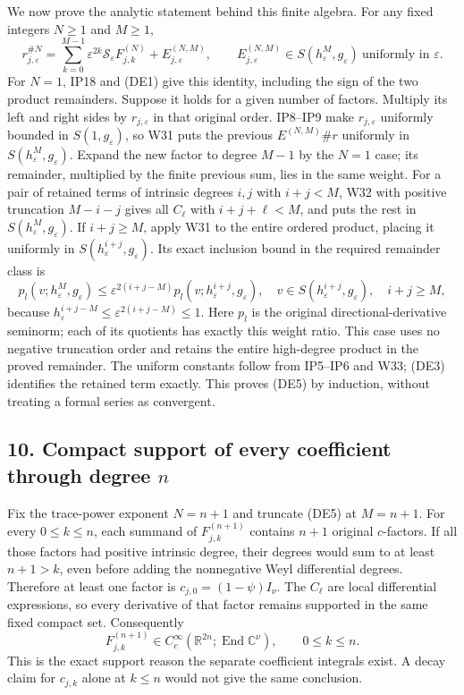 \documentclass[
  11pt,
]{article}
\begin{document}
We now prove the analytic statement behind this finite algebra. For any
fixed integers \(N\ge1\) and \(M\ge1\), \[
 r_{j,\varepsilon}^{\# N}
 =\sum_{k=0}^{M-1}
        \varepsilon^{2k}
          \mathscr S_\varepsilon F_{j,k}^{(N)}
       +E_{j,\varepsilon}^{(N,M)},\qquad
 E_{j,\varepsilon}^{(N,M)}
       \in S(h_\varepsilon^M,g_\varepsilon)
       \ \text{uniformly in }\varepsilon .
 \tag{DE5}
\] For \(N=1\), IP18 and (DE1) give this identity, including the sign of
the two product remainders. Suppose it holds for a given number of
factors. Multiply its left and right sides by \(r_{j,\varepsilon}\) in
that original order. IP8--IP9 make \(r_{j,\varepsilon}\) uniformly
bounded in \(S(1,g_\varepsilon)\), so W31 puts the previous
\(E^{(N,M)}\#r\) uniformly in \(S(h_\varepsilon^M,g_\varepsilon)\).
Expand the new factor to degree \(M-1\) by the \(N=1\) case; its
remainder, multiplied by the finite previous sum, lies in the same
weight. For a pair of retained terms of intrinsic degrees \(i,j\) with
\(i+j<M\), W32 with positive truncation \(M-i-j\) gives all \(C_\ell\)
with \(i+j+\ell<M\), and puts the rest in
\(S(h_\varepsilon^M,g_\varepsilon)\). If \(i+j\geq M\), apply W31 to the
entire ordered product, placing it uniformly in
\(S(h_\varepsilon^{i+j},g_\varepsilon)\). Its exact inclusion bound in
the required remainder class is \[
 p_l(v;h_\varepsilon^M,g_\varepsilon)
 \leq\varepsilon^{2(i+j-M)}
                 p_l(v;h_\varepsilon^{i+j},g_\varepsilon),
 \quad v\in S(h_\varepsilon^{i+j},g_\varepsilon),\quad i+j\geq M,
 \tag{DE5a}
\] because \(h_\varepsilon^{i+j-M}\leq\varepsilon^{2(i+j-M)}\leq1\).
Here \(p_l\) is the original directional-derivative seminorm; each of
its quotients has exactly this weight ratio. This case uses no negative
truncation order and retains the entire high-degree product in the
proved remainder. The uniform constants follow from IP5--IP6 and W33;
(DE3) identifies the retained term exactly. This proves (DE5) by
induction, without treating a formal series as convergent.

\subsection{\texorpdfstring{10. Compact support of every coefficient
through degree
\(n\)}{10. Compact support of every coefficient through degree n}}\label{compact-support-of-every-coefficient-through-degree-n}

Fix the trace-power exponent \(N=n+1\) and truncate (DE5) at \(M=n+1\).
For every \(0\le k\le n\), each summand of \(F_{j,k}^{(n+1)}\) contains
\(n+1\) original \(c\)-factors. If all those factors had positive
intrinsic degree, their degrees would sum to at least \(n+1>k\), even
before adding the nonnegative Weyl differential degrees. Therefore at
least one factor is \(c_{j,0}=(1-\psi)I_\nu\). The \(C_\ell\) are local
differential expressions, so every derivative of that factor remains
supported in the same fixed compact set. Consequently \[
 F_{j,k}^{(n+1)}
   \in C_c^\infty(\mathbb R^{2n};
                  \operatorname{End}\mathbb C^\nu),
       \qquad 0\le k\le n .
 \tag{DE6}
\] This is the exact support reason the separate coefficient integrals
exist. A decay claim for \(c_{j,k}\) alone at \(k\le n\) would not give
the same conclusion.
\end{document}
